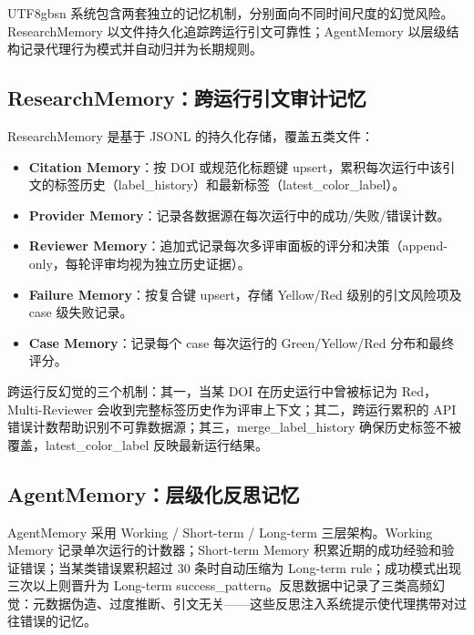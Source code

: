 \documentclass[11pt,a4paper]{article}
\begin{document}
\begin{CJK*}{UTF8}{gbsn}
系统包含两套独立的记忆机制，分别面向不同时间尺度的幻觉风险。ResearchMemory 以文件持久化追踪跨运行引文可靠性；AgentMemory 以层级结构记录代理行为模式并自动归并为长期规则。

\subsection{ResearchMemory：跨运行引文审计记忆}

ResearchMemory 是基于 JSONL 的持久化存储，覆盖五类文件：

\begin{itemize}[leftmargin=*,nosep]
  \item \textbf{Citation Memory}：按 DOI 或规范化标题键 upsert，累积每次运行中该引文的标签历史（label\_history）和最新标签（latest\_color\_label）。
  \item \textbf{Provider Memory}：记录各数据源在每次运行中的成功/失败/错误计数。
  \item \textbf{Reviewer Memory}：追加式记录每次多评审面板的评分和决策（append-only，每轮评审均视为独立历史证据）。
  \item \textbf{Failure Memory}：按复合键 upsert，存储 Yellow/Red 级别的引文风险项及 case 级失败记录。
  \item \textbf{Case Memory}：记录每个 case 每次运行的 Green/Yellow/Red 分布和最终评分。
\end{itemize}

跨运行反幻觉的三个机制：其一，当某 DOI 在历史运行中曾被标记为 Red，Multi-Reviewer 会收到完整标签历史作为评审上下文；其二，跨运行累积的 API 错误计数帮助识别不可靠数据源；其三，merge\_label\_history 确保历史标签不被覆盖，latest\_color\_label 反映最新运行结果。

\subsection{AgentMemory：层级化反思记忆}

AgentMemory 采用 Working / Short-term / Long-term 三层架构。Working Memory 记录单次运行的计数器；Short-term Memory 积累近期的成功经验和验证错误；当某类错误累积超过 30 条时自动压缩为 Long-term rule；成功模式出现三次以上则晋升为 Long-term success\_pattern。反思数据中记录了三类高频幻觉：元数据伪造、过度推断、引文无关——这些反思注入系统提示使代理携带对过往错误的记忆。


\end{CJK*}
\end{document}
